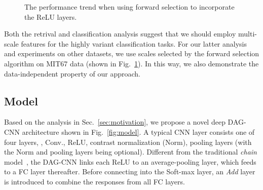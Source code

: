 \documentclass[10pt,twocolumn,letterpaper]{article}
\begin{document}
\begin{figure}[htbp]
\centering
\caption{The performance trend when using forward selection to incorporate the ReLU layers. }

\label{fig:forward_select}
\end{figure}


Both the retrival and classification analysis suggest that we should employ multi-scale features for the highly variant classification tasks. For our latter analysis and experiments on other datasets, we use scales selected by the forward selection algorithm on MIT67 data (shown in Fig.~\ref{fig:forward_select}). In this way, we also demonstrate the data-independent property of our approach.


\subsection{Model\label{sec:model}}

Based on the analysis in Sec.~\ref{sec:motivation}, we propose a novel deep DAG-CNN architecture shown in Fig.~\ref{fig:model}. A typical CNN layer consists one of four layers, \ie, Conv., ReLU, contrast normalization (Norm), pooling layers (with the Norm and pooling layers being optional). Different from the traditional \textit{chain} model~\cite{AlexNet,veryDeep}, the DAG-CNN links each ReLU to an average-pooling layer, which feeds to a FC layer thereafter. Before connecting into the Soft-max layer, an \textit{Add} layer is introduced to combine the responses from all FC layers. 
\end{document}
